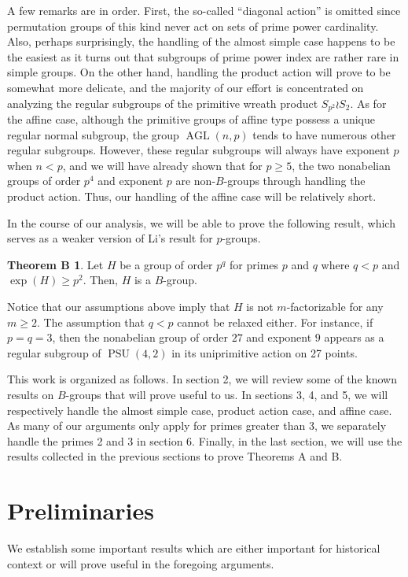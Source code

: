 \documentclass[12pt]{amsart}
\theoremstyle{definition}
\newtheorem*{thmB}{Theorem B}
\DeclareMathOperator{\PSU}{PSU}
\DeclareMathOperator{\AGL}{AGL}
\begin{document}
	A few remarks are in order. First, the so-called ``diagonal action'' is omitted since permutation groups of this kind never act on sets of prime power cardinality. Also, perhaps surprisingly, the handling of the almost simple case happens to be the easiest as it turns out that subgroups of prime power index are rather rare in simple groups. On the other hand, handling the product action will prove to be somewhat more delicate, and the majority of our effort is concentrated on analyzing the regular subgroups of the primitive wreath product $S_{p^2} \wr S_2$. As for the affine case, although the primitive groups of affine type possess a unique regular normal subgroup, the group $\AGL(n,p)$ tends to have numerous other regular subgroups. However, these regular subgroups will always have exponent $p$ when $n < p$, and we will have already shown that for $p \geq 5$, the two nonabelian groups of order $p^4$ and exponent $p$ are non-$B$-groups through handling the product action. Thus, our handling of the affine case will be relatively short.
	
	In the course of our analysis, we will be able to prove the following result, which serves as a weaker version of Li's result for $p$-groups.
	\begin{thmB}
		Let $H$ be a group of order $p^q$ for primes $p$ and $q$ where $q < p$ and $\exp(H) \geq p^2$. Then, $H$ is a $B$-group. 
	\end{thmB}
	Notice that our assumptions above imply that $H$ is not $m$-factorizable for any $m \geq 2$. The assumption that $q < p$ cannot be relaxed either. For instance, if $p = q = 3$, then the nonabelian group of order $27$ and exponent $9$ appears as a regular subgroup of $\PSU(4,2)$ in its uniprimitive action on 27 points. 
	
	This work is organized as follows. In section 2, we will review some of the known results on $B$-groups that will prove useful to us. In sections 3, 4, and 5, we will respectively handle the almost simple case, product action case, and affine case. As many of our arguments only apply for primes greater than 3, we separately handle the primes 2 and 3 in section 6. Finally, in the last section, we will use the results collected in the previous sections to prove Theorems A and B.
	  
	
	\section{Preliminaries}
	
	We establish some important results which are either important for historical context or will prove useful in the foregoing arguments. 
	
\end{document}
